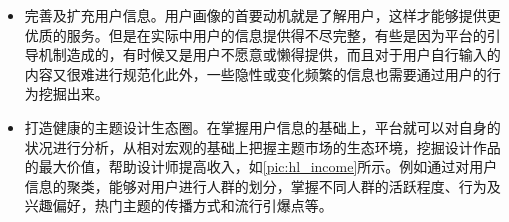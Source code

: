 \begin{itemize}
\item 完善及扩充用户信息。用户画像的首要动机就是了解用户，这样才能够提供更优质的服务。但是在实际中用户的信息提供得不尽完整，有些是因为平台的引导机制造成的，有时候又是用户不愿意或懒得提供，而且对于用户自行输入的内容又很难进行规范化此外，一些隐性或变化频繁的信息也需要通过用户的行为挖掘出来。
\item 打造健康的主题设计生态圈。在掌握用户信息的基础上，平台就可以对自身的状况进行分析，从相对宏观的基础上把握主题市场的生态环境，挖掘设计作品的最大价值，帮助设计师提高收入，如\autoref{pic:hl_income}所示。例如通过对用户信息的聚类，能够对用户进行人群的划分，掌握不同人群的活跃程度、行为及兴趣偏好，热门主题的传播方式和流行引爆点等。
\begin{figure}
\centering
  \label{pic:hl_income}
\end{figure}


\end{itemize}

